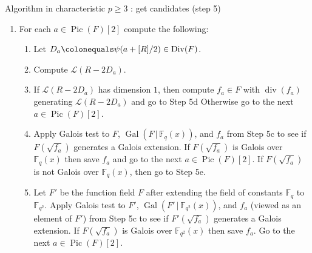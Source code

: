 \documentclass[handout,xcolor=dvipsnames]{beamer}
\theoremstyle{plain}
\newcommand{\FF}{\mathbb{F}}
\DeclareMathOperator{\Div}{Div}
\DeclareMathOperator{\Pic}{Pic}
\DeclareMathOperator{\ddiv}{div}
\DeclareMathOperator{\Gal}{Gal}
\begin{document}
  \begin{frame}{Algorithm in characteristic $p\geq 3$ : get candidates (step 5)}
    \begin{enumerate}
      \item[5.]
        For each $a\in\Pic(F)[2]$ compute the
        following:
        \begin{enumerate}
          \item[(a)]
            Let $D_a\colonequals\psi(a+[R]/2)
            \in\Div(F)$.
          \item[(b)]
            Compute $\mathscr{L}(R-2D_a)$.
          \item[(c)]
            If $\mathscr{L}(R-2D_a)$ has dimension
            $1$, then compute
            $f_a\in F$ with $\ddiv(f_a)$
            generating $\mathscr{L}(R-2D_a)$
            and go to Step 5d
            Otherwise go to the next
            $a\in\Pic(F)[2]$.
          \item[(d)]
            Apply Galois test
            to $F$,
            $\Gal(F\,|\,\FF_q(x))$,
            and $f_a$
            from Step 5c
            to see if $F(\sqrt{f_a})$
            generates a Galois extension.
            If $F(\sqrt{f_a})$ is Galois over
            $\FF_q(x)$ then save $f_a$
            and
            go to the next
            $a\in\Pic(F)[2]$.
            If $F(\sqrt{f_a})$ is not Galois
            over $\FF_q(x)$, then go to
            Step 5e.
          \item[(e)]
            Let $F'$ be the function field
            $F$ after extending the field of
            constants $\FF_q$ to $\FF_{q^2}$.
            Apply Galois test
            to $F'$,
            $\Gal(F'\,|\,\FF_{q^2}(x))$,
            and $f_a$
            (viewed as an element of $F'$)
            from Step 5c
            to see if $F'(\sqrt{f_a})$
            generates a Galois extension.
            If $F(\sqrt{f_a})$ is Galois over
            $\FF_{q^2}(x)$ then save $f_a$.
            Go to the next
            $a\in\Pic(F)[2]$.
        \end{enumerate}
    \end{enumerate}
  \end{frame}
\end{document}
